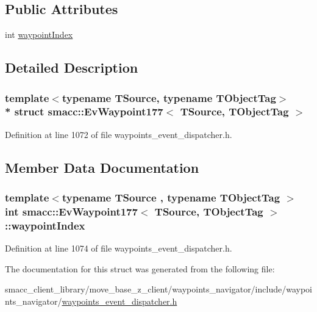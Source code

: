 \subsection*{Public Attributes}
\begin{DoxyCompactItemize}
\item 
int \hyperlink{structsmacc_1_1EvWaypoint177_ae384a368b9c4c7b6949110a137c325bc}{waypoint\+Index}
\end{DoxyCompactItemize}


\subsection{Detailed Description}
\subsubsection*{template$<$typename T\+Source, typename T\+Object\+Tag$>$\\*
struct smacc\+::\+Ev\+Waypoint177$<$ T\+Source, T\+Object\+Tag $>$}



Definition at line 1072 of file waypoints\+\_\+event\+\_\+dispatcher.\+h.



\subsection{Member Data Documentation}
\subsubsection[{\texorpdfstring{waypoint\+Index}{waypointIndex}}]{\setlength{\rightskip}{0pt plus 5cm}template$<$typename T\+Source , typename T\+Object\+Tag $>$ int {\bf smacc\+::\+Ev\+Waypoint177}$<$ T\+Source, T\+Object\+Tag $>$\+::waypoint\+Index}\hypertarget{structsmacc_1_1EvWaypoint177_ae384a368b9c4c7b6949110a137c325bc}{}\label{structsmacc_1_1EvWaypoint177_ae384a368b9c4c7b6949110a137c325bc}


Definition at line 1074 of file waypoints\+\_\+event\+\_\+dispatcher.\+h.



The documentation for this struct was generated from the following file\+:\begin{DoxyCompactItemize}
\item 
smacc\+\_\+client\+\_\+library/move\+\_\+base\+\_\+z\+\_\+client/waypoints\+\_\+navigator/include/waypoints\+\_\+navigator/\hyperlink{waypoints__event__dispatcher_8h}{waypoints\+\_\+event\+\_\+dispatcher.\+h}\end{DoxyCompactItemize}

